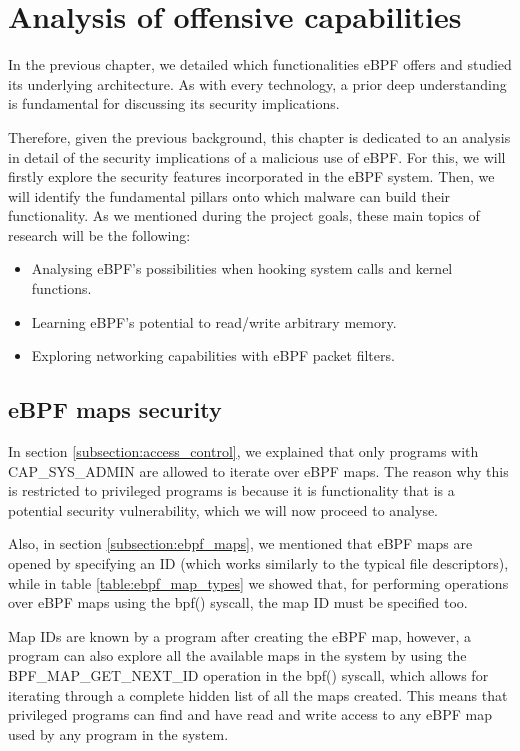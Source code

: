 \chapter{Analysis of offensive capabilities} \label{chapter:analysis_offensive_capabilities}
In the previous chapter, we detailed which functionalities eBPF offers and studied its underlying architecture. As with every technology, a prior deep understanding is fundamental for discussing its security implications. 

Therefore, given the previous background, this chapter is dedicated to an analysis in detail of the security implications of a malicious use of eBPF. For this, we will firstly explore the security features incorporated in the eBPF system. Then, we will identify the fundamental pillars onto which malware can build their functionality. As we mentioned during the project goals, these main topics of research will be the following:
\begin{itemize}
\item Analysing eBPF's possibilities when hooking system calls and kernel functions.
\item Learning eBPF's potential to read/write arbitrary memory.
\item Exploring networking capabilities with eBPF packet filters.
\end{itemize}


\section{eBPF maps security}
In section \ref{subsection:access_control}, we explained that only programs with CAP\_SYS\_ADMIN are allowed to iterate over eBPF maps. The reason why this is restricted to privileged programs is because it is functionality that is a potential security vulnerability, which we will now proceed to analyse.

Also, in section \ref{subsection:ebpf_maps}, we mentioned that eBPF maps are opened by specifying an ID (which works similarly to the typical file descriptors), while in table \ref{table:ebpf_map_types} we showed that, for performing operations over eBPF maps using the bpf() syscall, the map ID must be specified too. 

Map IDs are known by a program after creating the eBPF map, however, a program can also explore all the available maps in the system by using the BPF\_MAP\_GET\_NEXT\_ID operation in the bpf() syscall, which allows for iterating through a complete hidden list of all the maps created. This means that privileged programs can find and have read and write access to any eBPF map used by any program in the system.

